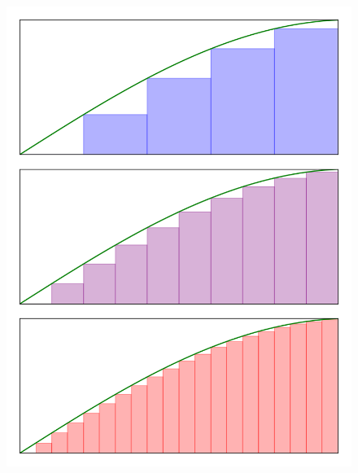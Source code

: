 \begin{figure}[H]
\centering
\begin{minipage}{.5\textwidth}
  \centering
  \includegraphics{Code/Area1.png}
  \label{fig:test1}
\end{minipage}%
\begin{minipage}{.5\textwidth}
  \centering

\end{minipage}
\end{figure}

